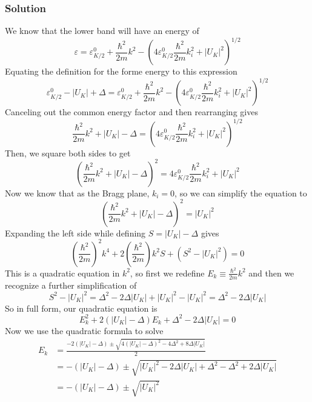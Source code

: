 \documentclass[12pt]{article}
\begin{document}
\subsubsection{Solution}
We know that the lower band will have an energy of
\begin{equation}
    \varepsilon = \varepsilon_{K/2}^0 + \frac{\hbar^2}{2m}k^2 - \left(4\varepsilon_{K/2}^0\frac{\hbar^2}{2m}k_i^2 + |U_K|^2\right)^{1/2}
\end{equation}
Equating the definition for the forme energy to this expression
\begin{equation}
    \varepsilon_{K/2}^0 - |U_K| + \Delta = \varepsilon_{K/2}^0 + \frac{\hbar^2}{2m}k^2 - \left(4\varepsilon_{K/2}^0\frac{\hbar^2}{2m}k_i^2 + |U_K|^2\right)^{1/2}
\end{equation}
Canceling out the common energy factor and then rearranging gives
\begin{equation}
    \frac{\hbar^2}{2m}k^2 + |U_K|- \Delta = \left(4\varepsilon_{K/2}^0\frac{\hbar^2}{2m}k_i^2 + |U_K|^2\right)^{1/2}
\end{equation}
Then, we square both sides to get
\begin{equation}
    \left(\frac{\hbar^2}{2m}k^2 + |U_K|- \Delta\right)^2 = 4\varepsilon_{K/2}^0\frac{\hbar^2}{2m}k_i^2 + |U_K|^2
\end{equation}
Now we know that as the Bragg plane, $k_i = 0$, so we can simplify the equation to
\begin{equation}
    \left(\frac{\hbar^2}{2m}k^2 + |U_K|- \Delta\right)^2 = |U_K|^2
\end{equation}
Expanding the left side while defining $S= |U_K| - \Delta$ gives
\begin{equation}
    \left(\frac{\hbar^2}{2m}\right)^2 k^4 + 2\left(\frac{\hbar^2}{2m}\right)k^2S + \left(S^2 - |U_K|^2\right) = 0
\end{equation}
This is a quadratic equation in $k^2$, so first we redefine $E_k \equiv \frac{\hbar^2}{2m}k^2$ and then we recognize a further simplification of
\begin{equation}
    S^2 - |U_K|^2 = \Delta^2 - 2\Delta|U_K| + |U_K|^2 - |U_K|^2 = \Delta^2 - 2\Delta|U_K|
\end{equation}
So in full form, our quadratic equation is
\begin{equation}
    E_k^2 + 2\left( |U_K| - \Delta\right)E_k + \Delta^2 - 2\Delta|U_K| = 0
\end{equation}
Now we use the quadratic formula to solve
\begin{align}
    E_k &= \frac{-2\left( |U_K| - \Delta\right) \pm \sqrt{4\left( |U_K| - \Delta\right)^2 - 4\Delta^2 + 8\Delta|U_K|}}{2} \\
    &= -\left( |U_K| - \Delta\right) \pm \sqrt{|U_K|^2 - 2\Delta|U_K| + \Delta^2 - \Delta^2 + 2\Delta|U_K|} \\
    &= -\left( |U_K| - \Delta\right) \pm \sqrt{|U_K|^2} \\
\end{align}
\end{document}
